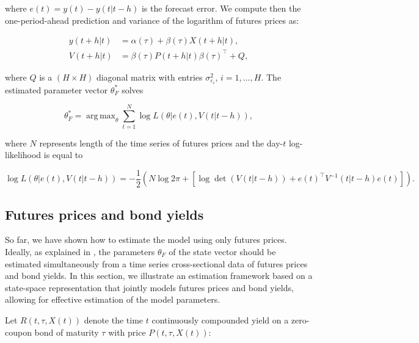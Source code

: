 \documentclass{article}
\DeclareMathOperator*{\argmax}{arg\,max}
\begin{document}
\noindent where $e(t) = y(t) - y(t|t-h)$ is the forecast error. We compute then the one-period-ahead prediction and variance of the logarithm of futures prices as:

\begin{align} \label{eq_obs1_fut}
    y(t+h|t) &= \alpha(\tau) + \beta (\tau) X(t+h|t), \\ 
    \label{eq_obs1_fut2}
    V(t+h|t) &= \beta (\tau) P(t+h|t) \beta(\tau)^\top + Q,
\end{align}

\noindent where $Q$ is a $(H\times H)$ diagonal matrix with entries $\sigma^2_{\varepsilon_i}$, $i=1,\ldots,H$. The estimated parameter vector $\theta^*_F$ solves

\begin{equation*}
    \theta^*_{F} = \argmax_{\theta} \sum_{t=1}^N \log L(\theta|e(t) , V(t|t-h) ), 
\end{equation*}

\noindent where $N$ represents length of the time series of futures prices and the day-$t$ log-likelihood is equal to

\begin{equation} \label{eq_likelihood}
    \log L ( \theta | e(t), V(t|t-h) ) = - \frac{1}{2} \left( N \log{2\pi} + \left[ \log \det{(V(t|t-h))} + e(t)^\top V^{-1}(t|t-h) e(t) \right] \right).
\end{equation}

\subsection{Futures prices and bond yields} \label{sec_bond_estimation}


So far, we have shown how to estimate the model using only futures prices. Ideally, as explained in \cite{schwartz97}, the parameters $\theta_F$ of the state vector should be estimated simultaneously from a time series cross-sectional data of futures prices and bond yields. In this section, we illustrate an estimation framework based on a state-space representation that jointly models futures prices and bond yields, allowing for effective estimation of the model parameters. 

Let  $R(t, \tau , {X}(t))$ denote the time $t$ continuously compounded yield on a zero-coupon bond of maturity $\tau$ with price $P(t, \tau, X(t))$: 
\end{document}
